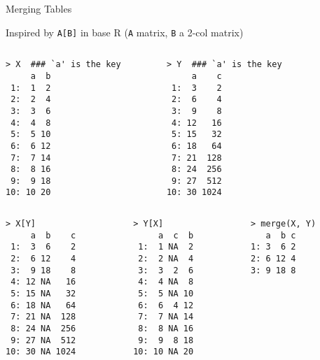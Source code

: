 \documentclass[12pt]{beamer}
\begin{document}
\begin{frame}[fragile]{Merging Tables}

Inspired by \texttt{A[B]} in base R (\texttt{A} matrix, \texttt{B} a 2-col matrix)

\begin{columns}

\begin{column}[t]{3cm}
\begin{verbatim}
> X  ### `a' is the key
     a  b
 1:  1  2
 2:  2  4
 3:  3  6
 4:  4  8
 5:  5 10
 6:  6 12
 7:  7 14
 8:  8 16
 9:  9 18
10: 10 20
\end{verbatim}
\end{column}

\begin{column}[t]{3cm}
\begin{verbatim}
> Y  ### `a' is the key
     a    c
 1:  3    2
 2:  6    4
 3:  9    8
 4: 12   16
 5: 15   32
 6: 18   64
 7: 21  128
 8: 24  256
 9: 27  512
10: 30 1024
\end{verbatim}
\end{column}

\begin{column}[t]{3cm}
\end{column}

\end{columns}

\begin{columns}

\begin{column}[t]{3cm}
\begin{verbatim}
> X[Y]
     a  b    c
 1:  3  6    2
 2:  6 12    4
 3:  9 18    8
 4: 12 NA   16
 5: 15 NA   32
 6: 18 NA   64
 7: 21 NA  128
 8: 24 NA  256
 9: 27 NA  512
10: 30 NA 1024
\end{verbatim}
\end{column}

\begin{column}[t]{3cm}
\begin{verbatim}
> Y[X]
     a  c  b
 1:  1 NA  2
 2:  2 NA  4
 3:  3  2  6
 4:  4 NA  8
 5:  5 NA 10
 6:  6  4 12
 7:  7 NA 14
 8:  8 NA 16
 9:  9  8 18
10: 10 NA 20
\end{verbatim}
\end{column}

\begin{column}[t]{3cm}
\begin{verbatim}
> merge(X, Y)
   a  b c
1: 3  6 2
2: 6 12 4
3: 9 18 8
\end{verbatim}
\end{column}

\end{columns}

\end{frame}
\end{document}
